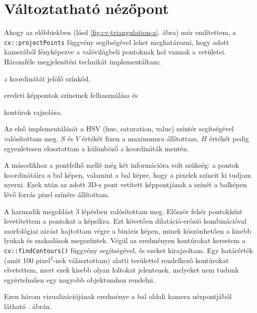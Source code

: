 \section{Változtatható nézőpont}

Ahogy az előbbiekben (lásd \ref{fig:cv-triangulation-a}. ábra) már említettem, a \texttt{cv::projectPoints} függvény segítségével lehet meghatározni, hogy adott kamerából fényképezve a valóvilágbeli pontoknak hol vannak a vetületei. Háromféle megjelenítési technikát implementáltam; \begin{inparaenum}[\itshape 1\upshape)]
\item $z$ koordinátát jelölő színkód,
\item eredeti képpontok színeinek felhasználása és
\item kontúrok rajzolása.
\end{inparaenum}

Az első implementálását a HSV (hue, saturation, value) színtér segítségével valósítottam meg. $S$ és $V$ értékét fixen a maximumra állítottam, $H$ értékét pedig egyenletesen elosztottam a különböző $z$ koordináták mentén.

A másodikhoz a pontfelhő mellé még két információra volt szükség: a pontok koordinátáira a bal képen, valamint a bal képre, hogy a pixelek színeit ki tudjam nyerni. Ezek után az adott 3D-s pont vetített képpontjának a színét a balképen lévő forrás pixel színére állítottam.

A harmadik megoldást 3 lépésben valósítottam meg. Először fehér pontokként levetítettem a pontokat a képsíkra. Ezt követően dilatáció-erózió kombinációval morfológiai zárást hajtottam végre a bináris képen, minek köszönhetően a kisebb lyukak és szakadások megszűntek. Végül az eredményen kontúrokat kerestem a \texttt{cv::findContours()} függvény segítségével, és ezeket kirajzoltam. Egy határérték (amit 100 pixel$^2$-nek választottam) alatti területtel rendelkező kontúrokat elvetettem, mert ezek kisebb olyan foltokat jelentenek, melyeket nem tudunk egyértelműen egy nagyobb objektumhoz rendelni.

Ezen három vizualizációjának eredménye a bal oldali kamera nézpontjából látható . ábrán.

